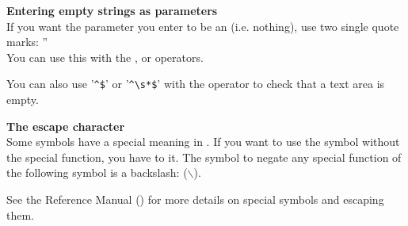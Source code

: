 
\textbf{Entering empty strings as parameters}\\
If you want the parameter you enter to be an  (i.e. nothing), use two single quote marks: ''\\

You can use this with the ,  or  operators.

You can also use '\verb+^$+' or '\verb+^\s*$+' with the operator  to check that a text area is empty.  



\textbf{The escape character}\\
Some symbols have a special meaning in \jb{}. If you want to use the symbol without the special function, you have to  it. The symbol to negate any special function of the following symbol is a backslash: ($\backslash$). 
                          
See the Reference Manual () for more details on special symbols and escaping them.


